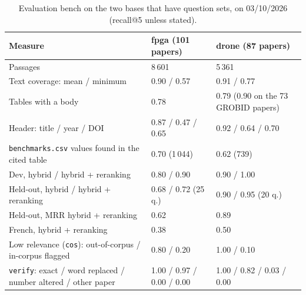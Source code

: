 \documentclass[11pt,a4paper]{article}
\newcommand{\cmd}[1]{\texttt{#1}}
\begin{document}
\begin{table}[ht]
\centering
\caption{Evaluation bench on the two bases that have question sets, on 03/10/2026
(recall@5 unless stated).}
\label{tab:drone}
\small
\begin{tabularx}{\linewidth}{@{}Lll@{}}
\toprule
Measure & fpga (101 papers) & drone (87 papers) \\
\midrule
Passages & 8\,601 & 5\,361 \\
Text coverage: mean / minimum & 0.90 / 0.57 & 0.91 / 0.77 \\
Tables with a body & 0.78 & 0.79 (0.90 on the 73 GROBID papers) \\
Header: title / year / DOI & 0.87 / 0.47 / 0.65 & 0.92 / 0.64 / 0.70 \\
\cmd{benchmarks.csv} values found in the cited table & 0.70 (1\,044) & 0.62 (739) \\
Dev, hybrid / hybrid + reranking & 0.80 / 0.90 & 0.90 / 1.00 \\
Held-out, hybrid / hybrid + reranking & 0.68 / 0.72 (25 q.) & 0.90 / 0.95 (20 q.) \\
Held-out, MRR hybrid + reranking & 0.62 & 0.89 \\
French, hybrid + reranking & 0.38 & 0.50 \\
Low relevance (\cmd{cos}): out-of-corpus / in-corpus flagged & 0.80 / 0.20 & 1.00 / 0.10 \\
\cmd{verify}: exact / word replaced / number altered / other paper & 1.00 / 0.97 / 0.00 / 0.00 & 1.00 / 0.82 / 0.03 / 0.00 \\
\bottomrule
\end{tabularx}
\end{table}
\end{document}
